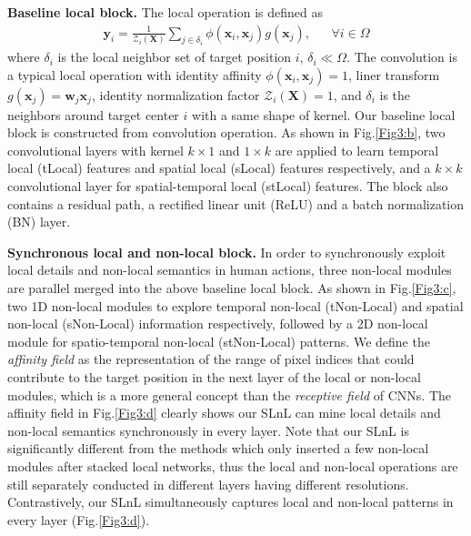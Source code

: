 \documentclass{article}
\begin{document}
\textbf{Baseline local block.}
The local operation is defined as
{\myfont
	\begin{align}
	\bm{y}_i = \frac{1}{\mathcal{Z}_i(\bm{X})}\sum_{j\in\delta_i} \phi (\bm{x}_i,\bm{x}_j)g(\bm{x}_j),  && \forall i \in \Omega
	\end{align}
}where {\myfont$ \delta_i $} is the local neighbor set of target position $  i $, {\myfont$ \delta_i\ll \Omega $}.
The convolution is a typical local operation with identity affinity {\myfont$ \phi (\bm{x}_i,\bm{x}_j) = 1 $}, liner transform {\myfont$ g(\bm{x}_j) = \bm{w}_j\bm{x}_j $}, identity normalization factor {\myfont$ \mathcal{Z}_i(\bm{X})=1$}, and {\myfont$ \delta_i $} is the neighbors around target center $ i $ with a same shape of kernel. Our baseline local block is constructed from convolution operation. As shown in Fig.\ref{Fig3:b}, two convolutional layers with kernel {\myfont$ k\times 1  $} and {\myfont$ 1\times k $} are applied to learn temporal local (tLocal) features and spatial local (sLocal) features respectively, and a {\myfont$ k \times k $} convolutional layer for spatial-temporal local (stLocal) features. The block also contains a residual path, a rectified linear unit (ReLU) and a batch normalization (BN) layer.

\textbf{Synchronous local and non-local block.} In order to synchronously exploit local details and non-local semantics in human actions, three non-local modules are parallel merged into the above baseline local block. As shown in Fig.\ref{Fig3:c}, two 1D non-local modules to explore temporal non-local (tNon-Local) and spatial non-local (sNon-Local) information respectively, followed by a 2D non-local module for spatio-temporal non-local (stNon-Local) patterns. We define the \textit{affinity field} as the representation of the range of pixel indices that could contribute to the target position in the next layer of the local or non-local modules, which is a more general concept than the \textit{receptive field} of CNNs. The affinity field in Fig.\ref{Fig3:d} clearly shows our SLnL can mine local details and non-local semantics synchronously in every layer. Note that our SLnL is significantly different from the methods \cite{DBLP:journals/corr/abs-1711-07971,DBLP:journals/corr/abs-1806-02919} which only inserted a few non-local modules after stacked local networks, thus the local and non-local operations are still separately conducted in different layers having different resolutions. Contrastively, our SLnL simultaneously captures local and non-local patterns in every layer (Fig.\ref{Fig3:d}).
\end{document}
